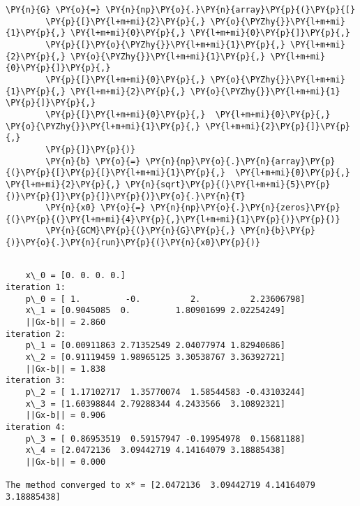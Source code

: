     \begin{Verbatim}[commandchars=\\\{\}]
        \PY{n}{G} \PY{o}{=} \PY{n}{np}\PY{o}{.}\PY{n}{array}\PY{p}{(}\PY{p}{[}
        \PY{p}{[}\PY{l+m+mi}{2}\PY{p}{,} \PY{o}{\PYZhy{}}\PY{l+m+mi}{1}\PY{p}{,} \PY{l+m+mi}{0}\PY{p}{,} \PY{l+m+mi}{0}\PY{p}{]}\PY{p}{,}
        \PY{p}{[}\PY{o}{\PYZhy{}}\PY{l+m+mi}{1}\PY{p}{,} \PY{l+m+mi}{2}\PY{p}{,} \PY{o}{\PYZhy{}}\PY{l+m+mi}{1}\PY{p}{,} \PY{l+m+mi}{0}\PY{p}{]}\PY{p}{,}
        \PY{p}{[}\PY{l+m+mi}{0}\PY{p}{,} \PY{o}{\PYZhy{}}\PY{l+m+mi}{1}\PY{p}{,} \PY{l+m+mi}{2}\PY{p}{,} \PY{o}{\PYZhy{}}\PY{l+m+mi}{1} \PY{p}{]}\PY{p}{,}
        \PY{p}{[}\PY{l+m+mi}{0}\PY{p}{,}  \PY{l+m+mi}{0}\PY{p}{,} \PY{o}{\PYZhy{}}\PY{l+m+mi}{1}\PY{p}{,} \PY{l+m+mi}{2}\PY{p}{]}\PY{p}{,}
        \PY{p}{]}\PY{p}{)}
        \PY{n}{b} \PY{o}{=} \PY{n}{np}\PY{o}{.}\PY{n}{array}\PY{p}{(}\PY{p}{[}\PY{p}{[}\PY{l+m+mi}{1}\PY{p}{,}  \PY{l+m+mi}{0}\PY{p}{,} \PY{l+m+mi}{2}\PY{p}{,} \PY{n}{sqrt}\PY{p}{(}\PY{l+m+mi}{5}\PY{p}{)}\PY{p}{]}\PY{p}{]}\PY{p}{)}\PY{o}{.}\PY{n}{T}
        \PY{n}{x0} \PY{o}{=} \PY{n}{np}\PY{o}{.}\PY{n}{zeros}\PY{p}{(}\PY{p}{(}\PY{l+m+mi}{4}\PY{p}{,}\PY{l+m+mi}{1}\PY{p}{)}\PY{p}{)}
        \PY{n}{GCM}\PY{p}{(}\PY{n}{G}\PY{p}{,} \PY{n}{b}\PY{p}{)}\PY{o}{.}\PY{n}{run}\PY{p}{(}\PY{n}{x0}\PY{p}{)}
\end{Verbatim}

    \begin{Verbatim}[commandchars=\\\{\}]

	x\_0 = [0. 0. 0. 0.]
iteration 1:
	p\_0 = [ 1.         -0.          2.          2.23606798]
	x\_1 = [0.9045085  0.         1.80901699 2.02254249]
	||Gx-b|| = 2.860
iteration 2:
	p\_1 = [0.00911863 2.71352549 2.04077974 1.82940686]
	x\_2 = [0.91119459 1.98965125 3.30538767 3.36392721]
	||Gx-b|| = 1.838
iteration 3:
	p\_2 = [ 1.17102717  1.35770074  1.58544583 -0.43103244]
	x\_3 = [1.60398844 2.79288344 4.2433566  3.10892321]
	||Gx-b|| = 0.906
iteration 4:
	p\_3 = [ 0.86953519  0.59157947 -0.19954978  0.15681188]
	x\_4 = [2.0472136  3.09442719 4.14164079 3.18885438]
	||Gx-b|| = 0.000

The method converged to x* = [2.0472136  3.09442719 4.14164079 3.18885438]

    \end{Verbatim}    
